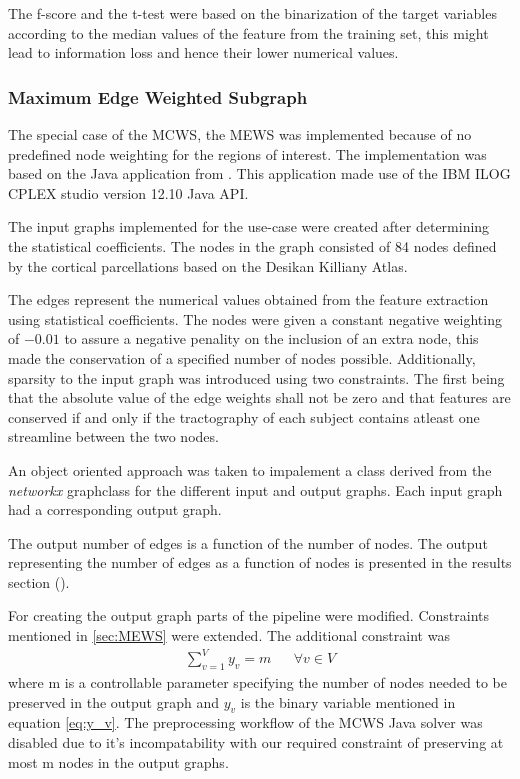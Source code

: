 \documentclass[msthesis.tex]{subfiles}
\begin{document}
The f-score and the t-test were based on the binarization of the target variables according to the median values of the feature from the training set, this might lead to information loss and hence their lower numerical values. 
\fi

\subsubsection{Maximum Edge Weighted Subgraph}
\label{method:MEWS}

The special case of the MCWS, the MEWS was implemented because of no predefined node weighting for the regions of interest. The implementation was based on  the Java application from \cite{DBLP:journals/corr/LobodaAS16}. This application made use of the IBM ILOG CPLEX studio version 12.10 Java API. 

The input graphs implemented for the use-case were created after determining the statistical coefficients. The nodes in the graph consisted of 84 nodes defined by the cortical parcellations based on the Desikan Killiany Atlas. 

The edges represent the numerical values obtained from the feature extraction using statistical coefficients. The nodes were given a constant negative weighting of $-0.01$ to assure a negative penality on the inclusion of an extra node, this made the conservation of a specified number of nodes possible. Additionally, sparsity to the input graph was introduced using two constraints. The first being that the absolute value of the edge weights shall not be zero and that features are conserved if and only if the tractography of each subject contains atleast one streamline between the two nodes. 

An object oriented approach was taken to impalement a class derived from the \textit{networkx} graphclass for the different input and output graphs. Each input graph had a corresponding output graph. 

The output number of edges is a function of the number of nodes. The output representing the number of edges as a function of nodes is presented in the results section (). 

For creating the output graph parts of the pipeline \cite{DBLP:journals/corr/LobodaAS16} were modified. Constraints mentioned in \ref{sec:MEWS} were extended. The additional constraint was 
\begin{align}
    \label{eq:sum_constraints}
    \sum_{v=1}^{V} y_v = m        &&  \forall v \in V
\end{align}
where m is a controllable parameter specifying the number of nodes needed to be preserved in the output graph and $y_v$ is the binary variable mentioned in equation \ref{eq:y_v}. The preprocessing workflow of the MCWS Java solver was disabled due to it's incompatability with our required constraint of preserving at most m nodes in the output graphs.
\end{document}
